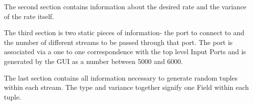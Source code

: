 \documentclass[a4paper,12pt]{article}
\begin{document}
The second section contains information about the desired rate and the variance
of the rate itself.

The third section is two static pieces of information- the port to connect to
and the number of different streams to be passed through that port. The port is
associated via a one to one correspondence with the top level Input Ports and is
generated by the GUI as a number between 5000 and 6000.

The last section contains all information necessary to generate random tuples
within each stream. The type and variance together signify one Field within each
tuple.
\end{document}
